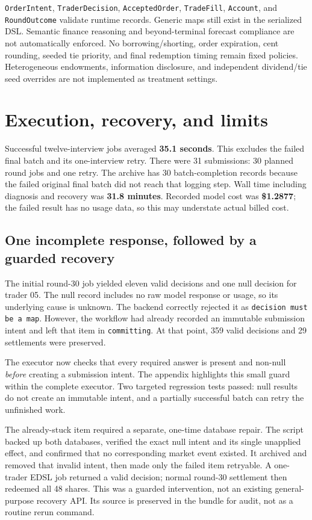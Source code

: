 \documentclass[11pt,letterpaper]{article}
\begin{document}
\texttt{OrderIntent}, \texttt{TraderDecision}, \texttt{AcceptedOrder},
\texttt{TradeFill}, \texttt{Account}, and \texttt{RoundOutcome} validate runtime
records. Generic maps still exist in the serialized DSL. Semantic finance
reasoning and beyond-terminal forecast compliance are not automatically enforced.
No borrowing/shorting, order expiration, cent rounding, seeded tie priority,
and final redemption timing remain fixed policies. Heterogeneous endowments,
information disclosure, and independent dividend/tie seed overrides are not
implemented as treatment settings.

\clearpage
\section{Execution, recovery, and limits}
Successful twelve-interview jobs averaged \textbf{35.1 seconds}. This excludes
the failed final batch and its one-interview retry. There were 31 submissions:
30 planned round jobs and one retry. The archive has 30 batch-completion
records because the failed original final batch did not reach that logging
step. Wall time including diagnosis and recovery was \textbf{31.8 minutes}.
Recorded model cost was \textbf{\$1.2877}; the failed result has no usage data,
so this may understate actual billed cost.

\subsection*{One incomplete response, followed by a guarded recovery}
The initial round-30 job yielded eleven valid decisions and one null decision
for trader 05. The null record includes no raw model response or usage,
so its underlying cause is unknown. The backend correctly rejected it as
\texttt{decision must be a map}. However, the workflow had already recorded
an immutable submission intent and left that item in \texttt{committing}.
At that point, 359 valid decisions and 29 settlements were preserved.

The executor now checks that every required answer is present and non-null
\emph{before} creating a submission intent. The appendix highlights this
small guard within the complete executor. Two targeted regression tests passed:
null results do not create an immutable intent, and a partially successful
batch can retry the unfinished work.

The already-stuck item required a separate, one-time database repair. The
script backed up both databases, verified the exact null intent and its single
unapplied effect, and confirmed that no corresponding market event existed.
It archived and removed that invalid intent, then made only the failed item
retryable. A one-trader EDSL job returned a valid decision; normal round-30
settlement then redeemed all 48 shares. This was a guarded intervention,
not an existing general-purpose recovery API. Its source is preserved in the
bundle for audit, not as a routine rerun command.
\end{document}
